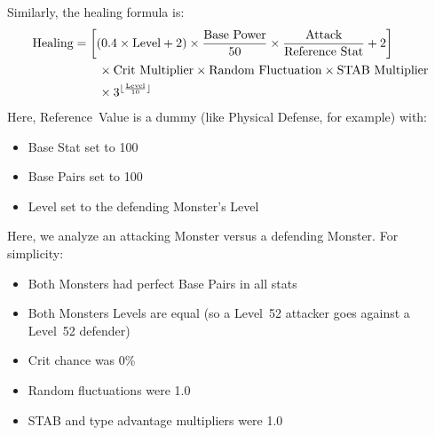 Similarly, the healing formula is:
\begin{align*}
	\text{Healing} &= \left[\left(0.4\times \text{Level} + 2\right) \times \frac{\text{Base Power}}{50} \times \frac{\text{Attack}}{\text{Reference Stat}} + 2\right]\\
		& \qquad \times \text{Crit Multiplier} \times \text{Random Fluctuation} \times \text{STAB Multiplier}\\
		& \qquad \times 3^{\lfloor\frac{\text{Level}}{10}\rfloor}
\end{align*}
Here, Reference~Value is a dummy  (like Physical Defense, for example) with:
\begin{itemize}
	\item{Base Stat set to 100}
	\item{Base Pairs set to 100}
	\item{Level set to the defending Monster's Level}
\end{itemize}



Here, we analyze an attacking Monster versus a defending Monster. For simplicity:\\
\begin{itemize}
	\item{Both Monsters had perfect Base Pairs in all stats}
	\item{Both Monsters Levels are equal (so a Level~52 attacker goes against a Level~52 defender)}
	\item{Crit chance was 0\%}
	\item{Random fluctuations were 1.0}
	\item{STAB and type advantage multipliers were 1.0}
\end{itemize}

\begin{multicols}{2}

	

\end{multicols}

